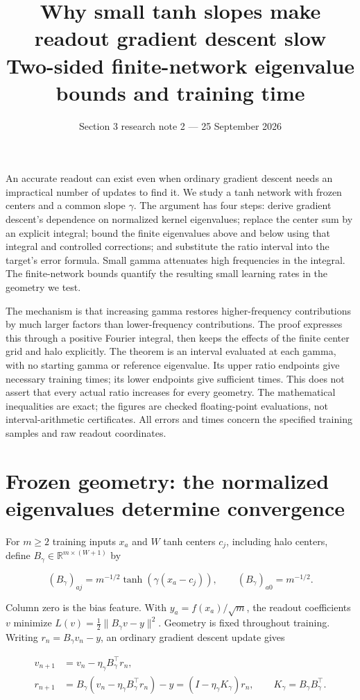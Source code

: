 \documentclass[11pt]{article}
\title{Why small tanh slopes make readout gradient descent slow\\[4pt]\large Two-sided finite-network eigenvalue bounds and training time}
\author{}\date{Section 3 research note 2 --- 25 September 2026}
\begin{document}
\maketitle
An accurate readout can exist even when ordinary gradient descent needs an impractical number of updates to find it. We study a tanh network with frozen centers and a common slope \(\gamma\). The argument has four steps: derive gradient descent's dependence on normalized kernel eigenvalues; replace the center sum by an explicit integral; bound the finite eigenvalues above and below using that integral and controlled corrections; and substitute the ratio interval into the target's error formula. Small gamma attenuates high frequencies in the integral. The finite-network bounds quantify the resulting small learning rates in the geometry we test.

The mechanism is that increasing gamma restores higher-frequency contributions by much larger factors than lower-frequency contributions. The proof expresses this through a positive Fourier integral, then keeps the effects of the finite center grid and halo explicitly. The theorem is an interval evaluated at each gamma, with no starting gamma or reference eigenvalue. Its upper ratio endpoints give necessary training times; its lower endpoints give sufficient times. This does not assert that every actual ratio increases for every geometry. The mathematical inequalities are exact; the figures are checked floating-point evaluations, not interval-arithmetic certificates. All errors and times concern the specified training samples and raw readout coordinates.

\section{Frozen geometry: the normalized eigenvalues determine convergence}

For \(m\ge2\) training inputs \(x_a\) and \(W\) tanh centers \(c_j\), including halo centers, define \(B_\gamma\in\mathbb R^{m\times(W+1)}\) by

\[
(B_\gamma)_{aj}=m^{-1/2}\tanh(\gamma(x_a-c_j)),
\qquad (B_\gamma)_{a0}=m^{-1/2}.
\]

Column zero is the bias feature. With \(y_a=f(x_a)/\sqrt m\), the readout coefficients \(v\) minimize \(L(v)=\tfrac12\|B_\gamma v-y\|^2\). Geometry is fixed throughout training. Writing \(r_n=B_\gamma v_n-y\), an ordinary gradient descent update gives

\[
\begin{aligned}
v_{n+1}&=v_n-\eta_\gamma B_\gamma^\top r_n,\\
r_{n+1}&=B_\gamma(v_n-\eta_\gamma B_\gamma^\top r_n)-y
=(I-\eta_\gamma K_\gamma)r_n,
\qquad K_\gamma=B_\gamma B_\gamma^\top.
\end{aligned}
\tag{1}
\]
\end{document}
